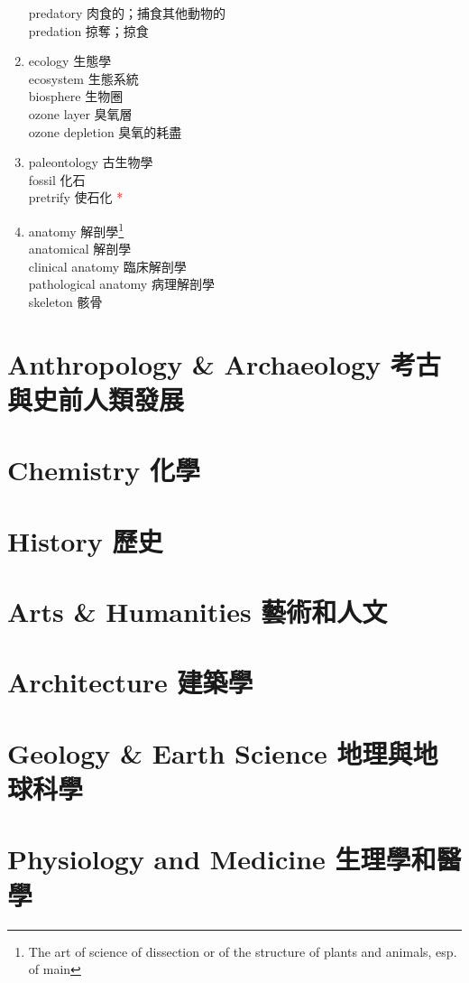 \documentclass[twoside,b5paper]{book}
\begin{document}
\begin{enumerate}
      predatory 肉食的；捕食其他動物的\\
      predation  掠奪；掠食
    \item
      ecology 生態學\\
      ecosystem  生態系統\\
      biosphere  生物圈\\
      ozone  layer 臭氧層\\
      ozone depletion 臭氧的耗盡
    \item
      paleontology  古生物學\\
      fossil  化石\\
      pretrify 使石化 \textcolor{red}{*}
    \item
      anatomy  解剖學\footnote{The art of science of dissection or of the structure of plants and animals, esp. of main}\\
      anatomical 解剖學\\
      clinical anatomy 臨床解剖學\\
      pathological  anatomy 病理解剖學\\
      skeleton  骸骨
  \end{enumerate}

  \chapter{Anthropology \& Archaeology 考古與史前人類發展}

  \chapter{Chemistry 化學}

  \chapter{History 歷史}

  \chapter{Arts \& Humanities 藝術和人文}

  \chapter{Architecture 建築學}

  \chapter{Geology \& Earth Science 地理與地球科學}

  \chapter{Physiology and Medicine 生理學和醫學}
\end{document}
